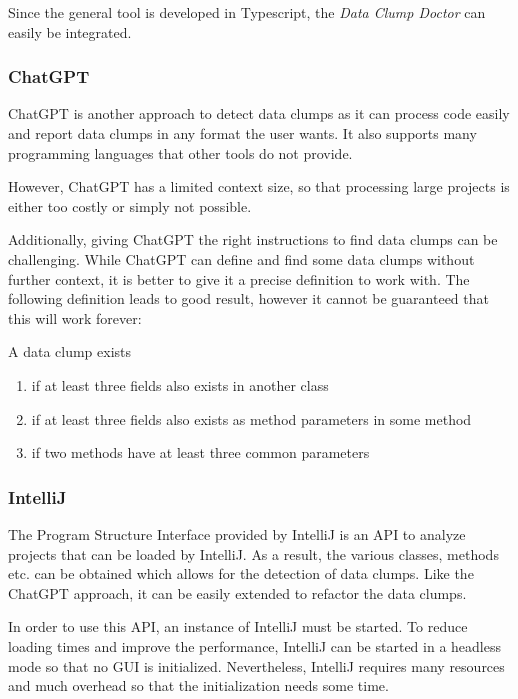 Since the general tool is developed in Typescript, the \textit{Data Clump Doctor} can easily be integrated.

\subsubsection{ChatGPT}
ChatGPT is another approach to detect data clumps as it can process code easily and report data clumps in any format the user wants. It also supports many programming languages that other tools do not provide.

However, ChatGPT has a limited context size, so that processing large projects is  either too costly or simply not possible.

Additionally, giving ChatGPT the right instructions to find data clumps can be challenging. While ChatGPT can define and find some data clumps without further context, it is better to give it a precise definition to work with. The following definition leads to good result, however it cannot be guaranteed that this will work forever:


A data clump exists
\begin{enumerate}
   
   \item if at least three fields also exists in another class
   \item if at least three fields also exists as method parameters in some method
    \item if two methods have at least three common parameters
\end{enumerate}


\subsubsection{IntelliJ}
The Program Structure Interface provided by IntelliJ is an \ac{API} to analyze projects that can be loaded by IntelliJ. As a result, the various classes, methods etc. can be obtained which allows for the detection of data clumps. Like the ChatGPT approach, it can be easily extended to refactor the data clumps.

In order to use this API, an instance of IntelliJ must be started. To reduce loading times and improve the performance, IntelliJ can be started in a headless mode so that no GUI is initialized. Nevertheless, IntelliJ requires many resources and much overhead so that  the initialization  needs some time. 

